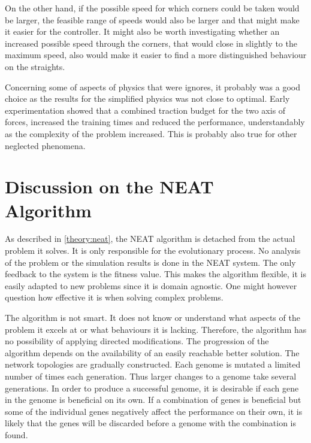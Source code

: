 On the other hand, if the possible speed for which corners could be taken would be larger, the feasible range of speeds would also be larger and that might make it easier for the controller. It might also be worth investigating whether an increased possible speed through the corners, that would close in slightly to the maximum speed, also would make it easier to find a more distinguished behaviour on the straights.

Concerning some of aspects of physics that were ignores, it probably was a good choice as the results for the simplified physics was not close to optimal. Early experimentation showed that a combined traction budget for the two axis of forces, increased the training times and reduced the performance, understandably as the complexity of the problem increased. This is probably also true for other neglected phenomena.


\section{Discussion on the NEAT Algorithm}
\label{discussion:neat_mechanism}
As described in \ref{theory:neat}, the NEAT algorithm is detached from the actual problem it solves. It is only responsible for the evolutionary process. No analysis of the problem or the simulation results is done in the NEAT system. The only feedback to the system is the fitness value. This makes the algorithm flexible, it is easily adapted to new problems since it is domain agnostic. One might however question how effective it is when solving complex problems.  

The algorithm is not smart. It does not know or understand what aspects of the problem it excels at or what behaviours it is lacking. Therefore, the algorithm has no possibility of applying directed modifications. The progression of the algorithm depends on the availability of an easily reachable better solution. The network topologies are gradually constructed. Each genome is mutated a limited number of times each generation. Thus larger changes to a genome take several generations. In order to produce a successful genome, it is desirable if each gene in the genome is beneficial on its own. If a combination of genes is beneficial but some of the individual genes negatively affect the performance on their own, it is likely that the genes will be discarded before a genome with the combination is found.

